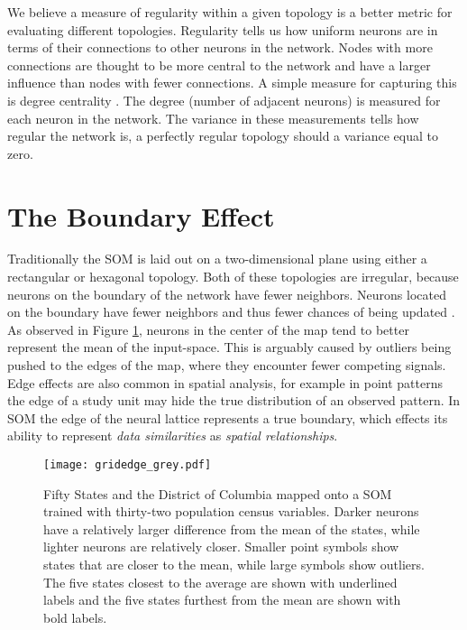 We believe a measure of regularity within a given topology is a better metric
for evaluating different topologies. Regularity tells us how uniform neurons
are in terms of their connections to other neurons in the network. Nodes with
more connections are thought to be more central to the network and have a
larger influence than nodes with fewer connections. A simple measure for
capturing this is degree centrality \cite{Wasserman:1994}.  The degree (number
of adjacent neurons) is measured for each neuron in the network. The variance
in these measurements tells how regular the network is, a perfectly regular
topology should a variance equal to zero.

\section{The Boundary Effect}
Traditionally the SOM is laid out on a two-dimensional plane using either a
rectangular or hexagonal topology.  Both of these topologies are irregular,
because neurons on the boundary of the network have fewer neighbors.  Neurons
located on the boundary have fewer neighbors and thus fewer chances of being
updated \citep{wu2006}.  As observed in Figure \ref{figure1}, neurons in the
center of the map tend to better represent the mean of the input-space.  This
is arguably caused by outliers being pushed to the edges of the map, where
they encounter fewer competing signals. 
Edge effects are also common in spatial analysis, for example in point
patterns the edge of a study unit may hide the true distribution of an
observed pattern.  In SOM the edge of the neural lattice represents a true
boundary, which effects its ability to represent \emph{data similarities} as
\emph{spatial relationships}.

\begin{figure}[htb]
\centering
\texttt{[image: gridedge\_grey.pdf]}
\caption{Fifty States and the District of Columbia mapped onto a
SOM trained with thirty-two population census variables.  Darker neurons have a
relatively larger difference from the mean of the states, while lighter
neurons are relatively closer.  Smaller point symbols show states that are closer to the
mean, while large symbols show outliers. The five states closest to the average are shown
with underlined labels and the five states furthest from the mean are shown with
bold labels.}
\label{figure1}
\end{figure}

